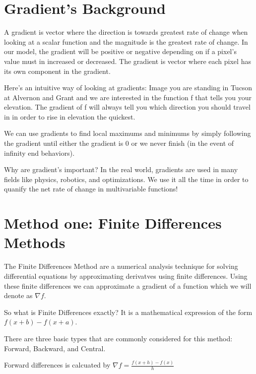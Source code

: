 \documentclass[letterpaper,10pt,english]{jupyterBook}
\begin{document}
\section{Gradient’s Background}
\label{\detokenize{finite_gradient:gradient-s-background}}
\sphinxAtStartPar
A gradient is vector where the direction is towards greatest rate of change when looking at a scalar function and the magnitude is the greatest rate of change. In our model, the gradient will be positive or negative depending on if a pixel’s value must in increased or decreased. The gradient is vector where each pixel has its own component in the gradient.

\sphinxAtStartPar
Here’s an intuitive way of looking at gradients: Image you are standing in Tucson at Alvernon and Grant and we are interested in the function f that tells you your elevation. The gradient of f will always tell you which direction you should travel in in order to rise in elevation the quickest.

\sphinxAtStartPar
We can use gradients to find local maximums and minimums by simply following the gradient until either the gradient is 0 or we never finish (in the event of infinity end behaviors).

\sphinxAtStartPar
Why are gradient’s important? In the real world, gradients are used in many fields like physics, robotics, and optimizations. We use it all the time in order to quanify the net rate of change in multi\sphinxhyphen{}variable functions!


\section{Method one: Finite Differences Methods}
\label{\detokenize{finite_gradient:method-one-finite-differences-methods}}
\sphinxAtStartPar
The Finite Differences Method are a numerical analysis technique for solving differential equations by approximating derivatves using finite differences. Using these finite differences we can approximate a gradient of a function which we will denote as \(\nabla f\).

\sphinxAtStartPar
So what is Finite Differences exactly? It is a mathematical expression of the form \(f(x+b)-f(x+a)\).

\sphinxAtStartPar
There are three basic types that are commonly considered for this method: Forward, Backward, and Central.

\sphinxAtStartPar
Forward differences is calcuated by \(\nabla f = \frac{f(x+h)-f(x)}{h}\)
\end{document}
